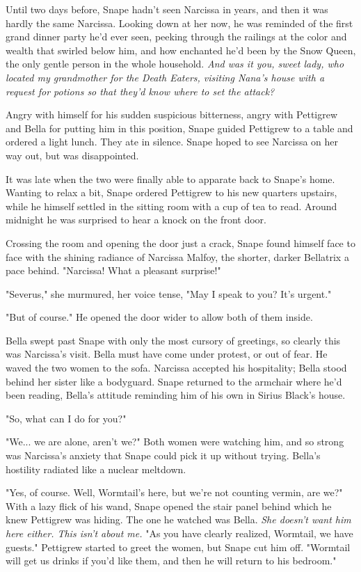 \documentclass[a4paper,11pt]{article}
\begin{document}
Until two days before, Snape hadn't seen Narcissa in years, and then it was hardly the same Narcissa. Looking down at her now, he was reminded of the first grand dinner party he'd ever seen, peeking through the railings at the color and wealth that swirled below him, and how enchanted he'd been by the Snow Queen, the only gentle person in the whole household. \emph{And was it you, sweet lady, who located my grandmother for the Death Eaters, visiting Nana's house with a request for potions so that they'd know where to set the attack?}

Angry with himself for his sudden suspicious bitterness, angry with Pettigrew and Bella for putting him in this position, Snape guided Pettigrew to a table and ordered a light lunch. They ate in silence. Snape hoped to see Narcissa on her way out, but was disappointed.

It was late when the two were finally able to apparate back to Snape's home. Wanting to relax a bit, Snape ordered Pettigrew to his new quarters upstairs, while he himself settled in the sitting room with a cup of tea to read. Around midnight he was surprised to hear a knock on the front door.

Crossing the room and opening the door just a crack, Snape found himself face to face with the shining radiance of Narcissa Malfoy, the shorter, darker Bellatrix a pace behind. "Narcissa! What a pleasant surprise!"

"Severus," she murmured, her voice tense, "May I speak to you? It's urgent."

"But of course." He opened the door wider to allow both of them inside.

Bella swept past Snape with only the most cursory of greetings, so clearly this was Narcissa's visit. Bella must have come under protest, or out of fear. He waved the two women to the sofa. Narcissa accepted his hospitality; Bella stood behind her sister like a bodyguard. Snape returned to the armchair where he'd been reading, Bella's attitude reminding him of his own in Sirius Black's house.

"So, what can I do for you?"

"We... we are alone, aren't we?" Both women were watching him, and so strong was Narcissa's anxiety that Snape could pick it up without trying. Bella's hostility radiated like a nuclear meltdown.

"Yes, of course. Well, Wormtail's here, but we're not counting vermin, are we?" With a lazy flick of his wand, Snape opened the stair panel behind which he knew Pettigrew was hiding. The one he watched was Bella. \emph{She doesn't want him here either. This isn't about me.} "As you have clearly realized, Wormtail, we have guests." Pettigrew started to greet the women, but Snape cut him off. "Wormtail will get us drinks if you'd like them, and then he will return to his bedroom."
\end{document}
